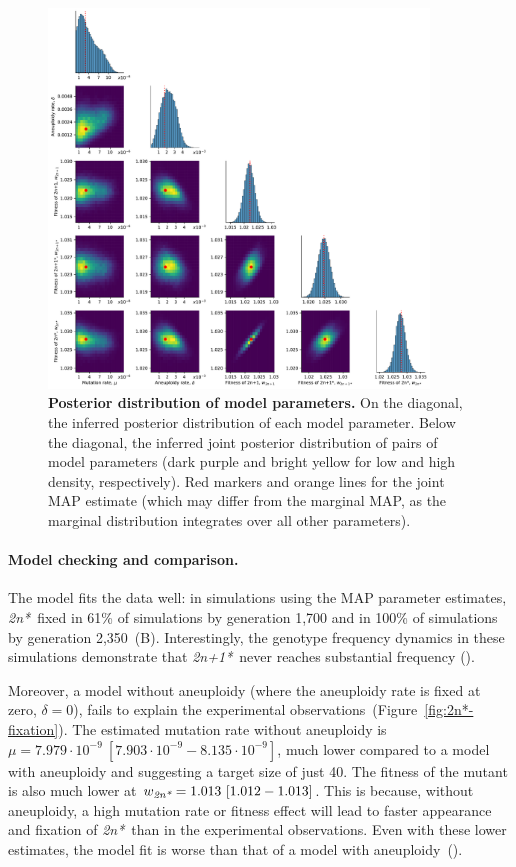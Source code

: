 \documentclass[12pt]{extarticle}
\newcommand{\eumt}{\emph{2n*}}
\newcommand{\anmt}{\emph{2n+1*}}
\begin{document}
\begin{figure}[p]
  \centering
\includegraphics[width=0.9\textwidth]{../figures/posterior.pdf}
  \caption{
  \textbf{Posterior distribution of model parameters.}
On the diagonal, the inferred posterior distribution of each model parameter. 
Below the diagonal, the inferred joint posterior distribution of pairs of model parameters (dark purple and bright yellow for low and high density, respectively). Red markers and orange lines for the joint MAP estimate (which may differ from the marginal MAP, as the marginal distribution integrates over all other parameters).
} 
  \label{fig:posterior}
\end{figure}

\paragraph{Model checking and comparison.}
The model fits the data well: in simulations using the MAP parameter estimates, \eumt\ fixed in 61\% of simulations by generation 1,700 and in 100\% of simulations by generation 2,350~(B). 
Interestingly, the genotype frequency dynamics in these simulations demonstrate that \anmt\ never reaches substantial frequency ().

Moreover, a model without aneuploidy (where the aneuploidy rate is fixed at zero, $\delta=0$), fails to explain the experimental observations~(Figure~\ref{fig:2n*-fixation}). %
The estimated mutation rate without aneuploidy is $\mu=7.979\cdot10^{-9}\ [7.903\cdot 10^{-9}-8.135\cdot10^{-9}]$, much lower compared to a model with aneuploidy and suggesting a target size of just 40. 
The fitness of the mutant is also much lower at $w_{\eumt}=1.013\ [1.012-1.013]$.
This is because, without aneuploidy, a high mutation rate or fitness effect will lead to faster appearance and fixation of \eumt\ than in the experimental observations. Even with these lower estimates, the model fit is worse than that of a model with aneuploidy~(). 
\end{document}
